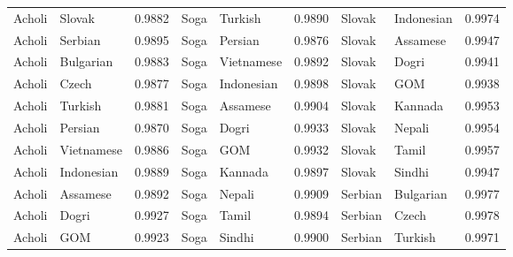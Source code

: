 \documentclass[11pt]{article} %
\begin{document}
\begin{table}
\begin{tabular}{llr@{\hspace{12pt}}llr@{\hspace{12pt}}llr}
            Acholi                       & Slovak              & 0.9882        & Soga                & Turkish             & 0.9890        & Slovak              & Indonesian          & 0.9974        \\
            Acholi                       & Serbian             & 0.9895        & Soga                & Persian             & 0.9876        & Slovak              & Assamese            & 0.9947        \\
            Acholi                       & Bulgarian           & 0.9883        & Soga                & Vietnamese          & 0.9892        & Slovak              & Dogri               & 0.9941        \\
            Acholi                       & Czech               & 0.9877        & Soga                & Indonesian          & 0.9898        & Slovak              & GOM                 & 0.9938        \\
            Acholi                       & Turkish             & 0.9881        & Soga                & Assamese            & 0.9904        & Slovak              & Kannada             & 0.9953        \\
            Acholi                       & Persian             & 0.9870        & Soga                & Dogri               & 0.9933        & Slovak              & Nepali              & 0.9954        \\
            Acholi                       & Vietnamese          & 0.9886        & Soga                & GOM                 & 0.9932        & Slovak              & Tamil               & 0.9957        \\
            Acholi                       & Indonesian          & 0.9889        & Soga                & Kannada             & 0.9897        & Slovak              & Sindhi              & 0.9947        \\
            Acholi                       & Assamese            & 0.9892        & Soga                & Nepali              & 0.9909        & Serbian             & Bulgarian           & 0.9977        \\
            Acholi                       & Dogri               & 0.9927        & Soga                & Tamil               & 0.9894        & Serbian             & Czech               & 0.9978        \\
            Acholi                       & GOM                 & 0.9923        & Soga                & Sindhi              & 0.9900        & Serbian             & Turkish             & 0.9971        \\

\end{tabular}
\end{table}
\end{document}
